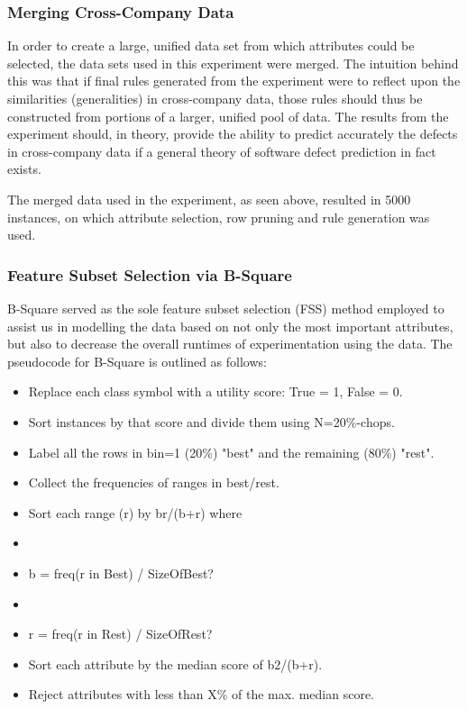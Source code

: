 \documentclass{sig-alternate}
\begin{document}
\subsubsection{Merging Cross-Company Data}

In order to create a large, unified data set from which attributes could be selected, the data sets used in this experiment were merged. The intuition behind this was that if final rules generated from the experiment were to reflect upon the similarities (generalities) in cross-company data, those rules should thus be constructed from portions of a larger, unified pool of data. The results from the experiment should, in theory, provide the ability to predict accurately the defects in cross-company data if a general theory of software defect prediction in fact exists.

The merged data used in the experiment, as seen above, resulted in 5000 instances, on which attribute selection, row pruning and rule generation was used.

\subsubsection{Feature Subset Selection via B-Square}

B-Square served as the sole feature subset selection (FSS) method employed to assist us in modelling the data based on not only the most important attributes, but also to decrease the overall runtimes of experimentation using the data. The pseudocode for B-Square is outlined as follows:

\begin{itemize}
	\item Replace each class symbol with a utility score: True = 1, False = 0.
    	\item Sort instances by that score and divide them using N=20\%-chops.
    	\item Label all the rows in bin=1 (20\%) "best" and the remaining (80\%) "rest".
    	\item Collect the frequencies of ranges in best/rest.
    	\item Sort each range (r) by b^^2/(b+r) where
          	\item\item b = freq(r in Best) / SizeOfBest?
          	\item\item r = freq(r in Rest) / SizeOfRest?
    	\item Sort each attribute by the median score of b2/(b+r).
    	\item Reject attributes with less than X\% of the max. median score. 
\end{itemize}
\end{document}
